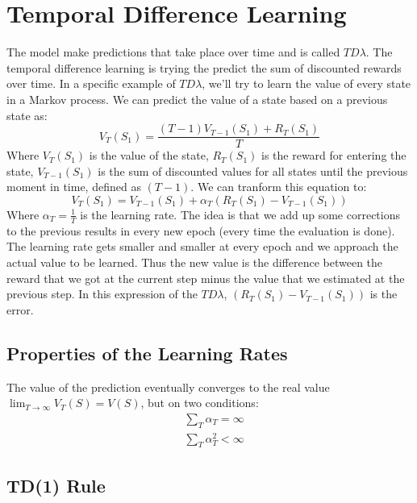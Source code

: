 \documentclass{article}
\begin{document}
\section{Temporal Difference Learning}
The model make predictions that take place over time and is called $TD\lambda$. The temporal difference learning is trying the predict the sum of discounted rewards over time. In a specific example of $TD\lambda$, we'll try to learn the value of every state in a Markov process. We can predict the value of a state based on a previous state as:
\begin{equation*}
  V_T(S_1) = \frac{(T - 1) V_{T - 1}(S_1) + R_T(S_1)}{T}
\end{equation*}
Where $V_T(S_1)$ is the value of the state, $R_T(S_1)$ is the reward for entering the state, $V_{T - 1}(S_1)$ is the sum of discounted values for all states until the previous moment in time, defined as $(T - 1)$.
We can tranform this equation to:
\begin{equation}
  V_T(S_1) = V_{T - 1}(S_1) + \alpha_T \left( R_T(S_1) - V_{T - 1}(S_1) \right)
\end{equation}
Where $\alpha_T = \frac{1}{T}$ is the learning rate. The idea is that we add up some corrections to the previous results in every new epoch (every time the evaluation is done). The learning rate gets smaller and smaller at every epoch and we approach the actual value to be learned.
Thus the new value is the difference between the reward that we got at the current step minus the value that we estimated at the previous step. In this expression of the $TD\lambda$, $\left( R_T(S_1) - V_{T - 1}(S_1) \right)$ is the error.
\subsection{Properties of the Learning Rates}
The value of the prediction eventually converges to the real value $\lim_{T\to\infty} V_T(S) = V(S)$, but on two conditions:
\begin{align}
  &\sum_{T} \alpha_T = \infty\\
  &\sum_{T} \alpha_T^2 < \infty
\end{align}
\subsection{TD(1) Rule}
\end{document}
